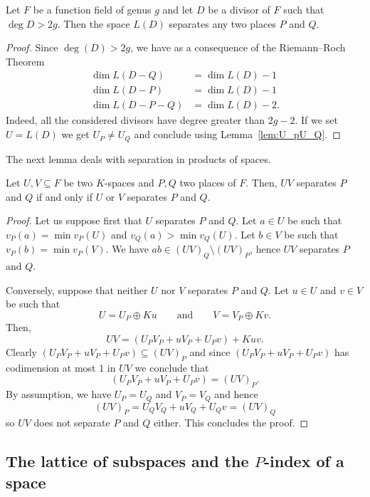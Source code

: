 \documentclass[ALCO,Unicode,ThmDefs]{cedram}
\begin{document}
\begin{lemm}\label{lem:L(D)sep}
Let $F$ be a function field of genus $g$ and let $D$ be a divisor of $F$ such that $\deg D > 2g$. Then the space $L(D)$ separates any two places $P$ and $Q$.
\end{lemm}

\begin{proof}
Since $\deg (D) > 2g$, we have as a consequence of the Riemann--Roch Theorem
\begin{align*}
\dim L(D-Q) &= \dim L(D)-1\\
\dim L(D-P) &= \dim L(D)-1\\
\dim L(D-P-Q) &= \dim L(D)-2.
\end{align*}
Indeed, all the considered divisors have degree greater than $2g-2$. If we set $U= L(D)$ we get $U_P \neq U_Q$ and conclude using Lemma~\ref{lem:U_pU_Q}.
\end{proof}

The next lemma deals with separation in products of spaces.

\begin{lemm}\label{lem:sep_products}
Let $U, V \subseteq F$ be two $K$-spaces and $P, Q$ two places of $F$. Then, $UV$ separates $P$ and $Q$ if and only if $U$ or $V$ separates $P$ and $Q$.
\end{lemm}

\begin{proof}
Let us suppose first that $U$ separates $P$ and $Q$.
Let $a \in U$ be such that $v_P(a)=\min v_P(U)$ and $v_Q(a) > \min v_Q(U)$. Let $b \in V$ be such that $v_P(b)=\min v_P(V)$. We have $ab \in (UV)_Q \setminus (UV)_P$, hence $UV$ separates $P$ and $Q$.

Conversely, suppose that neither $U$ nor $V$ separates $P$ and $Q$. Let $u \in U$ and $v\in V$ be such that
\[
U= U_P \oplus Ku \qquad \textrm{and} \qquad V= V_P \oplus Kv.
\]
Then,
\[
UV=(U_P V_P + uV_P + U_P v) + Kuv.
\]
Clearly $(U_P V_P + uV_P + U_P v) \subseteq {(UV)}_P$ and since $(U_P V_P + uV_P + U_P v)$ has codimension at most $1$ in $UV$ we conclude that
\[
(U_P V_P + uV_P + U_P v)={(UV)}_P.
\]
By assumption, we have $U_P= U_Q$ and $V_P= V_Q$ and hence
\[
{(UV)}_P= U_Q V_Q + u V_Q + U_Q v={(UV)}_Q
\]
so $UV$ does not separate $P$ and $Q$ either. This concludes the proof.
\end{proof}

\subsection{The lattice of subspaces and the \texorpdfstring{$P$}{P}-index of a space}\label{sec:Pindex}
\end{document}
